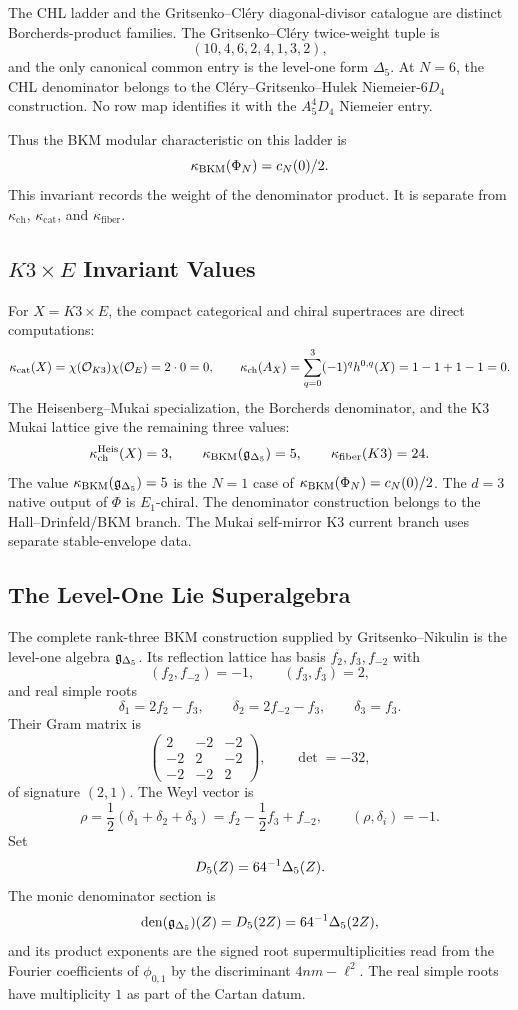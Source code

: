 The CHL ladder and the Gritsenko--Cl\'ery diagonal-divisor catalogue are
distinct Borcherds-product families. The Gritsenko--Cl\'ery twice-weight
tuple is
\[
  (10,4,6,2,4,1,3,2),
\]
and the only canonical common entry is the level-one form
\(\Delta_5\). At \(N=6\), the CHL denominator belongs to the
Cl\'ery--Gritsenko--Hulek Niemeier-\(6D_4\) construction. No row map
identifies it with the \(A_5^4D_4\) Niemeier entry.

Thus the BKM modular characteristic on this ladder is
\[
  \kappa_{\mathrm{BKM}}(\Phi_N)=c_N(0)/2 .
\]
This invariant records the weight of the denominator product. It is
separate from \(\kappa_{\mathrm{ch}}\), \(\kappa_{\mathrm{cat}}\), and
\(\kappa_{\mathrm{fiber}}\).

\subsection*{\texorpdfstring{$K3\times E$}{K3 x E} Invariant Values}

For \(X=K3\times E\), the compact categorical and chiral supertraces are
direct computations:
\[
  \kappa_{\mathrm{cat}}(X)=\chi(\mathcal{O}_{K3})\chi(\mathcal{O}_E)=2\cdot0=0,
  \qquad
  \kappa_{\mathrm{ch}}(A_X)=\sum_{q=0}^{3}(-1)^q h^{0,q}(X)=1-1+1-1=0.
\]
The Heisenberg--Mukai specialization, the Borcherds denominator, and the
K3 Mukai lattice give the remaining three values:
\[
  \kappa_{\mathrm{ch}}^{\mathrm{Heis}}(X)=3,\qquad
  \kappa_{\mathrm{BKM}}(\mathfrak{g}_{\Delta_5})=5,\qquad
  \kappa_{\mathrm{fiber}}(K3)=24.
\]
The value \(\kappa_{\mathrm{BKM}}(\mathfrak{g}_{\Delta_5})=5\) is the \(N=1\) case of
\(\kappa_{\mathrm{BKM}}(\Phi_N)=c_N(0)/2\). The \(d=3\) native output of
\(\Phi\) is \(E_1\)-chiral. The denominator construction belongs to the
Hall--Drinfeld/BKM branch. The Mukai self-mirror K3 current branch uses
separate stable-envelope data.

\subsection*{The Level-One Lie Superalgebra}

The complete rank-three BKM construction supplied by Gritsenko--Nikulin
is the level-one algebra \(\mathfrak{g}_{\Delta_5}\). Its reflection lattice
has basis \(f_2,f_3,f_{-2}\) with
\[
  (f_2,f_{-2})=-1,\qquad (f_3,f_3)=2,
\]
and real simple roots
\[
  \delta_1=2f_2-f_3,\qquad
  \delta_2=2f_{-2}-f_3,\qquad
  \delta_3=f_3 .
\]
Their Gram matrix is
\[
  \begin{pmatrix}
    2&-2&-2\\
    -2&2&-2\\
    -2&-2&2
  \end{pmatrix},
  \qquad \det=-32,
\]
of signature \((2,1)\). The Weyl vector is
\[
  \rho=\frac12(\delta_1+\delta_2+\delta_3)
  =f_2-\frac12 f_3+f_{-2},
  \qquad
  (\rho,\delta_i)=-1 .
\]
Set
\[
  D_5(Z)=64^{-1}\Delta_5(Z).
\]
The monic denominator section is
\[
  \operatorname{den}(\mathfrak{g}_{\Delta_5})(Z)=D_5(2Z)
  =64^{-1}\Delta_5(2Z),
\]
and its product exponents are the signed root supermultiplicities read
from the Fourier coefficients of \(\phi_{0,1}\) by the discriminant
\(4nm-\ell^2\). The real simple roots have multiplicity \(1\) as part
of the Cartan datum.

